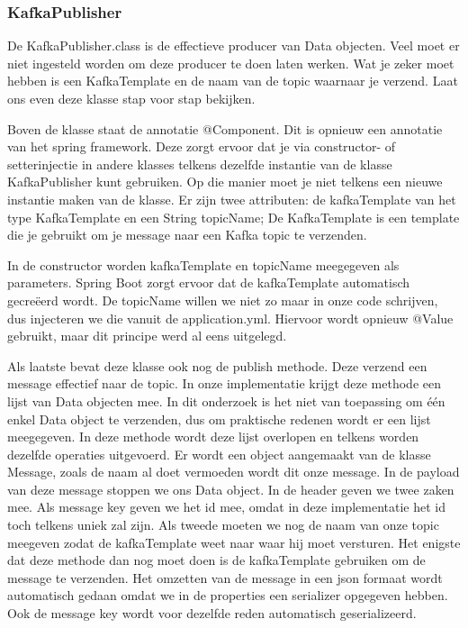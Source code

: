     \subsubsection{KafkaPublisher}
    De KafkaPublisher.class is de effectieve producer van Data objecten. Veel moet er niet ingesteld worden om deze producer te doen laten werken. Wat je zeker moet hebben is een KafkaTemplate en de naam van de topic waarnaar je verzend. Laat ons even deze klasse stap voor stap bekijken.
    
    Boven de klasse staat de annotatie @Component. Dit is opnieuw een annotatie van het spring framework. Deze zorgt ervoor dat je via constructor- of setterinjectie in andere klasses telkens dezelfde instantie van de klasse KafkaPublisher kunt gebruiken. Op die manier moet je niet telkens een nieuwe instantie maken van de klasse. Er zijn twee attributen: de kafkaTemplate van het type KafkaTemplate en een String topicName; De KafkaTemplate is een template die je gebruikt om je message naar een Kafka topic te verzenden.
    
    In de constructor worden kafkaTemplate en topicName meegegeven als parameters. Spring Boot zorgt ervoor dat de kafkaTemplate automatisch gecreëerd wordt. De topicName willen we niet zo maar in onze code schrijven, dus injecteren we die vanuit de application.yml. Hiervoor wordt opnieuw @Value gebruikt, maar dit principe werd al eens uitgelegd.
    
    Als laatste bevat deze klasse ook nog de publish methode. Deze verzend een message effectief naar de topic. In onze implementatie krijgt deze methode een lijst van Data objecten mee. In dit onderzoek is het niet van toepassing om één enkel Data object te verzenden, dus om praktische redenen wordt er een lijst meegegeven. In deze methode wordt deze lijst overlopen en telkens worden dezelfde operaties uitgevoerd. Er wordt een object aangemaakt van de klasse Message, zoals de naam al doet vermoeden wordt dit onze message. In de payload van deze message stoppen we ons Data object. In de header geven we twee zaken mee. Als message key geven we het id mee, omdat in deze implementatie het id toch telkens uniek zal zijn. Als tweede moeten we nog de naam van onze topic meegeven zodat de kafkaTemplate weet naar waar hij moet versturen. Het enigste dat deze methode dan nog moet doen is de kafkaTemplate gebruiken om de message te verzenden. Het omzetten van de message in een json formaat wordt automatisch gedaan omdat we in de properties een serializer opgegeven hebben. Ook de message key wordt voor dezelfde reden automatisch geserializeerd. 
 
